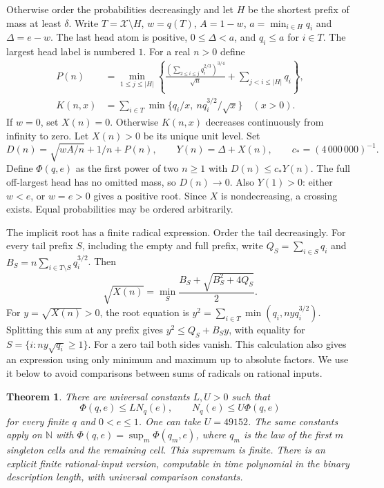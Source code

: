 \documentclass[11pt]{article}
\newtheorem{theorem}{Theorem}[section]
\begin{document}
Otherwise order the probabilities decreasingly and let $H$ be the shortest prefix of mass at least $\delta$. Write $T=\mathcal X\setminus H$, $w=q(T)$, $A=1-w$, $a=\min_{i\in H}q_i$ and $\Delta=e-w$. The last head atom is positive, $0\le\Delta<a$, and $q_i\le a$ for $i\in T$. The largest head label is numbered $1$. For a real $n>0$ define
\begin{align}
 P(n)&=\min_{1\le j\le |H|}\left\{
   \frac{(\sum_{2\le i\le j}q_i^{2/3})^{3/4}}{\sqrt n}
      +\sum_{j<i\le |H|}q_i\right\},\label{eq:P}\\
 K(n,x)&=\sum_{i\in T}\min\{q_i/x,\ n q_i^{3/2}/\sqrt x\}\quad(x>0).\label{eq:K}
\end{align}
If $w=0$, set $X(n)=0$. Otherwise $K(n,x)$ decreases continuously from infinity to zero. Let $X(n)>0$ be its unique unit level. Set
\begin{equation}\label{eq:cross}
 D(n)=\sqrt{wA/n}+1/n+P(n),\qquad
 Y(n)=\Delta+X(n),\qquad c_*=(4\,000\,000)^{-1}.
\end{equation}
Define $\Phi(q,e)$ as the first power of two $n\ge1$ with $D(n)\le c_*Y(n)$. The full off-largest head has no omitted mass, so $D(n)\to0$. Also $Y(1)>0$: either $w<e$, or $w=e>0$ gives a positive root. Since $X$ is nondecreasing, a crossing exists. Equal probabilities may be ordered arbitrarily.

The implicit root has a finite radical expression. Order the tail decreasingly. For every tail prefix $S$, including the empty and full prefix, write $Q_S=\sum_{i\in S}q_i$ and $B_S=n\sum_{i\in T\setminus S}q_i^{3/2}$. Then
\begin{equation}\label{eq:radical}
 \sqrt{X(n)}=\min_S \frac{B_S+\sqrt{B_S^2+4Q_S}}2 .
\end{equation}
For $y=\sqrt{X(n)}>0$, the root equation is $y^2=\sum_{i\in T}\min(q_i,n y q_i^{3/2})$. Splitting this sum at any prefix gives $y^2\le Q_S+B_S y$, with equality for $S=\{i:n y\sqrt{q_i}\ge1\}$. For a zero tail both sides vanish. This calculation also gives an expression using only minimum and maximum up to absolute factors. We use it below to avoid comparisons between sums of radicals on rational inputs.

\begin{theorem}\label{thm:main}
There are universal constants $L,U>0$ such that
\[
   \Phi(q,e)\le L N_q(e),\qquad N_q(e)\le U\Phi(q,e)
\]
for every finite $q$ and $0<e\le1$. One can take $U=49152$. The same constants apply on $\mathbb N$ with $\Phi(q,e)=\sup_m\Phi(q_m,e)$, where $q_m$ is the law of the first $m$ singleton cells and the remaining cell. This supremum is finite. There is an explicit finite rational-input version, computable in time polynomial in the binary description length, with universal comparison constants.
\end{theorem}
\end{document}
